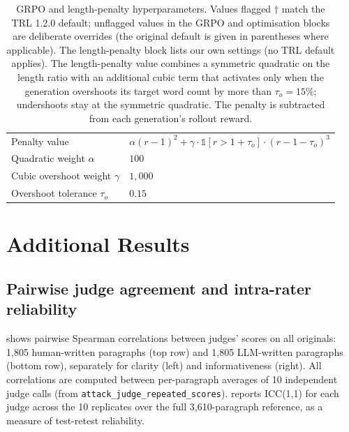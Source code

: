 \begin{table}[h]
\begin{tabular}{ll}
    Penalty value & $\alpha (r - 1)^2 + \gamma \cdot \mathbb{1}[r > 1 + \tau_o] \cdot (r - 1 - \tau_o)^3$ \\
    Quadratic weight $\alpha$ & $100$ \\
    Cubic overshoot weight $\gamma$ & $1{,}000$ \\
    Overshoot tolerance $\tau_o$ & $0.15$ \\
    \bottomrule
  \end{tabular}
  \caption{GRPO and length-penalty hyperparameters. Values flagged $\dagger$ match the TRL 1.2.0 default; unflagged values in the GRPO and optimisation blocks are deliberate overrides (the original default is given in parentheses where applicable). The length-penalty block lists our own settings (no TRL default applies). The length-penalty value combines a symmetric quadratic on the length ratio with an additional cubic term that activates only when the generation overshoots its target word count by more than $\tau_o = 15\%$; undershoots stay at the symmetric quadratic. The penalty is subtracted from each generation's rollout reward.}
  \label{tab:grpo-config}
\end{table}


\section{Additional Results}\label{app:additional-results}

\subsection{Pairwise judge agreement and intra-rater reliability}\label{app:judge-correlation}

 shows pairwise Spearman correlations between judges' scores on all originals: 1,805 human-written paragraphs (top row) and 1,805 LLM-written paragraphs (bottom row), separately for clarity (left) and informativeness (right). All correlations are computed between per-paragraph averages of 10 independent judge calls (from \texttt{attack\_judge\_repeated\_scores}).  reports ICC(1,1) for each judge across the 10 replicates over the full 3,610-paragraph reference, as a measure of test-retest reliability.

